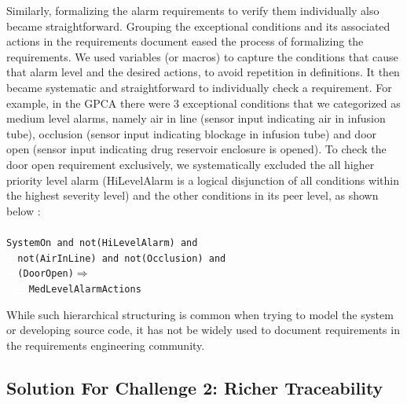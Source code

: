 Similarly, formalizing the alarm requirements to verify them individually also became straightforward. Grouping the exceptional conditions and its associated actions in the requirements document eased the process of formalizing the requirements. We used variables (or macros) to capture the conditions that cause that alarm level and the desired actions, to avoid repetition in definitions. It then became systematic and straightforward to individually check a requirement. For example, in the GPCA there were 3 exceptional conditions that we categorized as medium level alarms, namely air in line (sensor input indicating air in infusion tube), occlusion (sensor input indicating blockage in infusion tube) and door open (sensor input indicating drug reservoir enclosure is opened). To check the door open requirement exclusively, we systematically excluded the all higher priority level alarm (HiLevelAlarm is a logical disjunction of all conditions within the highest severity level) and the other conditions in its peer level, as shown below :
\\\\
\footnotesize{\texttt{SystemOn and not(HiLevelAlarm) and \\
\textcolor{white}{----}not(AirInLine) and not(Occlusion) and \\ \textcolor{white}{------}(DoorOpen)$\Rightarrow$\\
\textcolor{white}{--------} MedLevelAlarmActions}}
\\\normalsize{}

While such hierarchical structuring is common when trying to model the system or developing source code, it has not be widely used to document requirements in the requirements engineering community. %


\subsection {Solution For Challenge 2: Richer Traceability}

